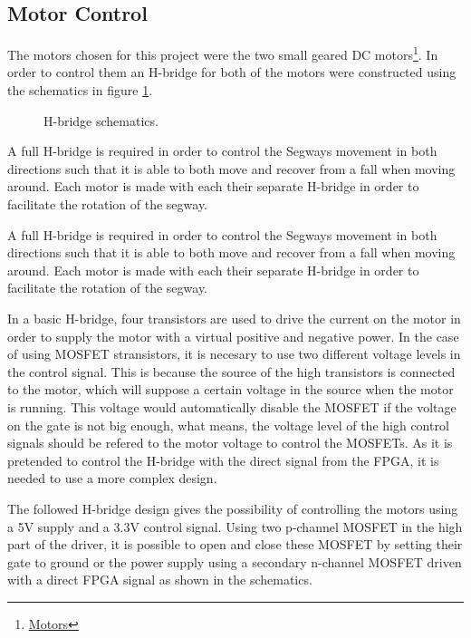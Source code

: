 
\subsection{Motor Control}
The motors chosen for this project were the two small geared DC motors\footnote{ \href{https://www.sparkfun.com/products/13258}{Motors}}.
In order to control them an H-bridge for both of the motors were constructed using the schematics in figure \ref{fig:hbridge}.


\begin{figure}[H]
\centering

\caption{H-bridge schematics.}
\label{fig:hbridge}
\end{figure}

A full H-bridge is required in order to control the Segways movement in both directions such that it is able to both move and recover from a fall when moving around.
Each motor is made with each their separate H-bridge in order to facilitate the rotation of the segway.

A full H-bridge is required in order to control the Segways movement in both directions such that it is able to both move and recover from a fall when moving around.
Each motor is made with each their separate H-bridge in order to facilitate the rotation of the segway.

In a basic H-bridge, four transistors are used to drive the current on the motor in order to supply the motor with a virtual positive and negative power.
In the case of using MOSFET stransistors, it is necesary to use two different voltage levels in the control signal.
This is because the source of the high transistors is connected to the motor, which will suppose a certain voltage in the source when the motor is running.
This voltage would automatically disable the MOSFET if the voltage on the gate is not big enough, what means, the voltage level of the high control signals should be refered to the motor voltage to control the MOSFETs.
As it is pretended to control the H-bridge with the direct signal from the FPGA, it is needed to use a more complex design.

The followed H-bridge design gives the possibility of controlling the motors using a 5V supply and a 3.3V control signal.
Using two p-channel MOSFET in the high part of the driver, it is possible to open and close these MOSFET by setting their gate to ground or the power supply using a secondary n-channel MOSFET driven with a direct FPGA signal as shown in the schematics.

